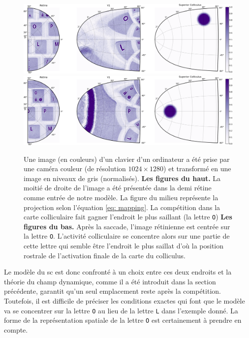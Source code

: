 \begin{figure}
  \centering
    \includegraphics[width=1.0\textwidth]{figures/ch3_10_colliculus-1}\\
    \includegraphics[width=1.0\textwidth]{figures/ch3_10_colliculus-2}
  \caption{Une image (en couleurs) d'un clavier d'un ordinateur a été prise par une caméra couleur (de résolution $1024 \times 1280$) et transformé en une image en niveaux de gris (normalisés). \textbf{Les figures du haut.} La moitié de droite de l'image a été présentée dans la demi rétine comme entrée de notre modèle. La figure du milieu représente la projection selon l'équation \ref{eq: mapping}. La compétition dans la carte colliculaire fait gagner l'endroit le plus saillant (la lettre {\tt O}) \textbf{Les figures du bas.} Après la saccade, l'image rétinienne est centrée sur la lettre {\tt O}. L'activité colliculaire se concentre alors sur une partie de cette lettre qui semble être l'endroit le plus saillat d'o\`u la position rostrale de l'activation finale de la carte du colliculus.}
  \label{fig: colliculus}
\end{figure}


Le modèle du \gls{sc} est donc confronté à un choix entre ces deux endroits et la théorie du champ dynamique, comme il a été introduit dans la section précédente, garantit qu'un seul emplacement reste après la compétition. Toutefois, il est difficile de préciser les conditions exactes qui font que le modèle va se concentrer sur la lettre {\tt O} au lieu de la lettre {\tt L} dans l'exemple donné. La forme de la représentation spatiale de la lettre {\tt O} est certainement à prendre en compte.

